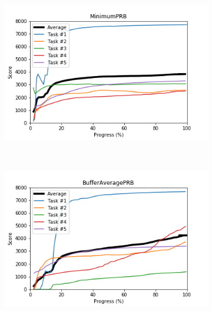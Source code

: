 \documentclass{article} %
\begin{document}
\begin{figure}[!ht]
    \begin{subfigure}[t]{0.5\textwidth}
        \centering
        \includegraphics[width=\textwidth]{images/MinimumPRB.png}
    \end{subfigure}%
    ~
    \begin{subfigure}[t]{0.5\textwidth}
        \centering
        \includegraphics[width=\textwidth]{images/BufferAveragePRB.png}
    \end{subfigure}%


\end{figure}
\end{document}
